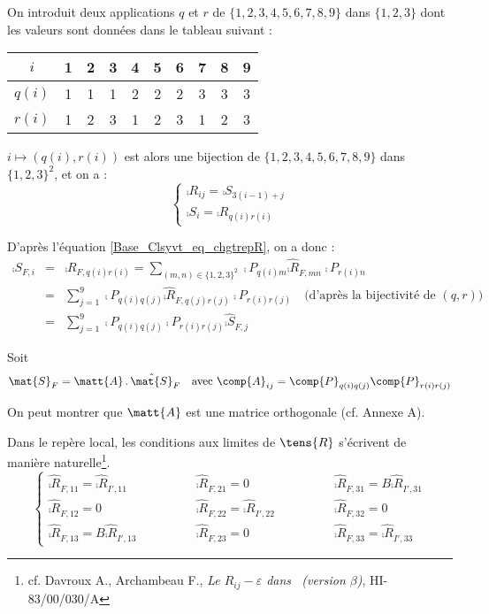 On introduit deux applications $q$ et $r$ de $\{1,2,3,4,5,6,7,8,9\}$ dans
$\{1,2,3\}$ dont les valeurs sont donn\'ees dans le tableau suivant :
\begin{center}
\begin{tabular}{|c|c|c|c|c|c|c|c|c|c|}
\hline
$i$&1&2&3&4&5&6&7&8&9\\
\hline
$q(i)$&1&1&1&2&2&2&3&3&3\\
\hline
$r(i)$&1&2&3&1&2&3&1&2&3\\
\hline
\end{tabular}
\end{center}
$i\longmapsto (q(i),r(i))$ est alors une bijection de $\{1,2,3,4,5,6,7,8,9\}$
dans $\{1,2,3\}^2$, et on a :
\begin{equation}
\left\{\begin{array}{l}
\comp{R}_{ij}=\comp{S}_{3(i-1)+j}\\
\comp{S}_i=\comp{R}_{q(i)r(i)}
\end{array}\right.
\end{equation}

D'apr\`es l'\'equation \ref{Base_Clsyvt_eq_chgtrepR}, on a donc :
\begin{eqnarray}
\comp{S}_{F,i} & = & \comp{R}_{F,q(i)r(i)} =
\sum_{(m,n)\in\{1,2,3\}^2}\comp{P}_{q(i)m}\hat{\comp{R}}_{F,mn}\comp{P}_{r(i)n}\nonumber\\
&=&\sum_{j=1}^9\comp{P}_{q(i)q(j)}\hat{\comp{R}}_{F,q(j)r(j)}\comp{P}_{r(i)r(j)}
\quad\text{(d'apr\`es la bijectivit\'e de $(q,r)$)}\nonumber\\
&=&\sum_{j=1}^9\comp{P}_{q(i)q(j)}\comp{P}_{r(i)r(j)}\hat{\comp{S}}_{F,j}
\end{eqnarray}

Soit
\begin{equation}
\mat{S}_{F}=\matt{A}\,.\,\hat{\mat{S}}_F\quad\text{avec }
\comp{A}_{ij}=\comp{P}_{q(i)q(j)}\comp{P}_{r(i)r(j)}
\end{equation}

On peut montrer que $\matt{A}$ est une matrice orthogonale (cf. Annexe A).

Dans le rep\`ere local, les conditions aux limites de $\tens{R}$ s'\'ecrivent de
mani\`ere naturelle\footnote{cf. Davroux A., Archambeau F., {\em Le
$R_{ij}-\varepsilon$ dans \CS\ (version $\beta$)}, HI-83/00/030/A}.
\begin{equation}
\label{Base_Clsyvt_eq_clRij}%
\left\{\begin{array}{lll}
\hat{\comp{R}}_{F,11}=\hat{\comp{R}}_{I',11} \qquad\qquad&
\hat{\comp{R}}_{F,21}=0 \qquad\qquad&
\hat{\comp{R}}_{F,31}=B\hat{\comp{R}}_{I',31} \\
\hat{\comp{R}}_{F,12}=0 \qquad\qquad&
\hat{\comp{R}}_{F,22}=\hat{\comp{R}}_{I',22} \qquad\qquad&
\hat{\comp{R}}_{F,32}=0 \\
\hat{\comp{R}}_{F,13}=B\hat{\comp{R}}_{I',13} \qquad\qquad&
\hat{\comp{R}}_{F,23}=0 \qquad\qquad&
\hat{\comp{R}}_{F,33}=\hat{\comp{R}}_{I',33}
\end{array}\right.
\end{equation}

